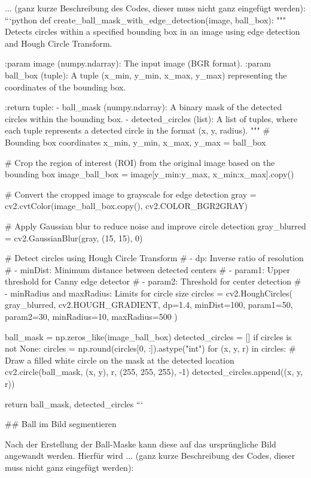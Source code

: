 ... (ganz kurze Beschreibung des Codes, dieser muss nicht ganz eingefügt werden):
```python
def create_ball_mask_with_edge_detection(image, ball_box):
    """
    Detects circles within a specified bounding box in an image using edge detection and Hough Circle Transform.

    :param image (numpy.ndarray): The input image (BGR format).
    :param ball_box (tuple): A tuple (x_min, y_min, x_max, y_max) representing the coordinates of the bounding box.

    :return tuple:
            - ball_mask (numpy.ndarray): A binary mask of the detected circles within the bounding box.
            - detected_circles (list): A list of tuples, where each tuple represents a detected circle
              in the format (x, y, radius).
    """
    # Bounding box coordinates
    x_min, y_min, x_max, y_max = ball_box

    # Crop the region of interest (ROI) from the original image based on the bounding box
    image_ball_box = image[y_min:y_max, x_min:x_max].copy()

    # Convert the cropped image to grayscale for edge detection
    gray = cv2.cvtColor(image_ball_box.copy(), cv2.COLOR_BGR2GRAY)

    # Apply Gaussian blur to reduce noise and improve circle detection
    gray_blurred = cv2.GaussianBlur(gray, (15, 15), 0)

    # Detect circles using Hough Circle Transform
    # - dp: Inverse ratio of resolution
    # - minDist: Minimum distance between detected centers
    # - param1: Upper threshold for Canny edge detector
    # - param2: Threshold for center detection
    # - minRadius and maxRadius: Limits for circle size
    circles = cv2.HoughCircles(
        gray_blurred, cv2.HOUGH_GRADIENT, dp=1.4, minDist=100,
        param1=50, param2=30, minRadius=10, maxRadius=500
    )

    ball_mask = np.zeros_like(image_ball_box)
    detected_circles = []
    if circles is not None:
        circles = np.round(circles[0, :]).astype("int")
        for (x, y, r) in circles:
            # Draw a filled white circle on the mask at the detected location
            cv2.circle(ball_mask, (x, y), r, (255, 255, 255), -1)
            detected_circles.append((x, y, r))

    return ball_mask, detected_circles
```



## Ball im Bild segmentieren

Nach der Erstellung der Ball-Maske kann diese auf das ursprüngliche Bild angewandt werden. 
Hierfür wird ... (ganz kurze Beschreibung des Codes, dieser muss nicht ganz eingefügt werden):

